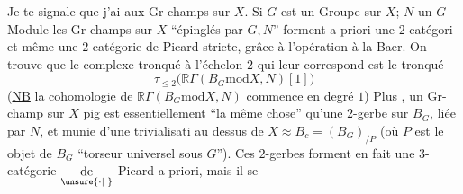
Je te signale que j'ai  aux Gr-champs sur $X$. Si $G$ est un Groupe sur $X$; $N$ un $G$-Module les Gr-champs sur $X$ ``épinglés par $G,N$'' forment a priori une $2$-catégori et même une $2$-catégorie de Picard stricte, grâce à l'opération  à la Baer. On trouve que le complexe  tronqué à l'échelon $2$ qui leur correspond est le tronqué
\[
\tau_{\leq 2}\bigl(\mathbb R\Gamma(B_{G}\mathbin{\mathrm{mod}}X,N)[1]\bigr)
\]
(\uline{NB} la cohomologie de $\mathbb R\Gamma(B_{G}\mathbin{\mathrm{mod}}X,N)$ commence en degré $1$) Plus , un Gr-champ sur $X$ pig  est essentiellement ``la même chose'' qu'une $2$-gerbe sur $B_{G}$, liée par $N$, et munie d'une trivialisati au dessus de $X\approx B_{c}=(B_{G})_{/P}$ (où $P$ est le objet de $B_{G}$ ``torseur universel sous $G$''). Ces $2$-gerbes forment en fait une $3$-catégorie
$\underset{\unsure{\cdot|\phantom{\cdot}}}{\text{de}}$ Picard a priori, mais il se
